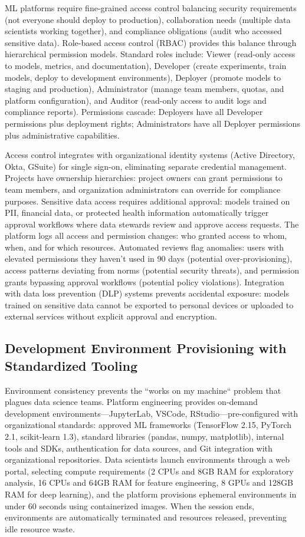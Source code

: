 ML platforms require fine-grained access control balancing security requirements (not everyone should deploy to production), collaboration needs (multiple data scientists working together), and compliance obligations (audit who accessed sensitive data). Role-based access control (RBAC) provides this balance through hierarchical permission models. Standard roles include: Viewer (read-only access to models, metrics, and documentation), Developer (create experiments, train models, deploy to development environments), Deployer (promote models to staging and production), Administrator (manage team members, quotas, and platform configuration), and Auditor (read-only access to audit logs and compliance reports). Permissions cascade: Deployers have all Developer permissions plus deployment rights; Administrators have all Deployer permissions plus administrative capabilities.

Access control integrates with organizational identity systems (Active Directory, Okta, GSuite) for single sign-on, eliminating separate credential management. Projects have ownership hierarchies: project owners can grant permissions to team members, and organization administrators can override for compliance purposes. Sensitive data access requires additional approval: models trained on PII, financial data, or protected health information automatically trigger approval workflows where data stewards review and approve access requests. The platform logs all access and permission changes: who granted access to whom, when, and for which resources. Automated reviews flag anomalies: users with elevated permissions they haven't used in 90 days (potential over-provisioning), access patterns deviating from norms (potential security threats), and permission grants bypassing approval workflows (potential policy violations). Integration with data loss prevention (DLP) systems prevents accidental exposure: models trained on sensitive data cannot be exported to personal devices or uploaded to external services without explicit approval and encryption.

\subsection{Development Environment Provisioning with Standardized Tooling}

Environment consistency prevents the ``works on my machine`` problem that plagues data science teams. Platform engineering provides on-demand development environments---JupyterLab, VSCode, RStudio---pre-configured with organizational standards: approved ML frameworks (TensorFlow 2.15, PyTorch 2.1, scikit-learn 1.3), standard libraries (pandas, numpy, matplotlib), internal tools and SDKs, authentication for data sources, and Git integration with organizational repositories. Data scientists launch environments through a web portal, selecting compute requirements (2 CPUs and 8GB RAM for exploratory analysis, 16 CPUs and 64GB RAM for feature engineering, 8 GPUs and 128GB RAM for deep learning), and the platform provisions ephemeral environments in under 60 seconds using containerized images. When the session ends, environments are automatically terminated and resources released, preventing idle resource waste.

